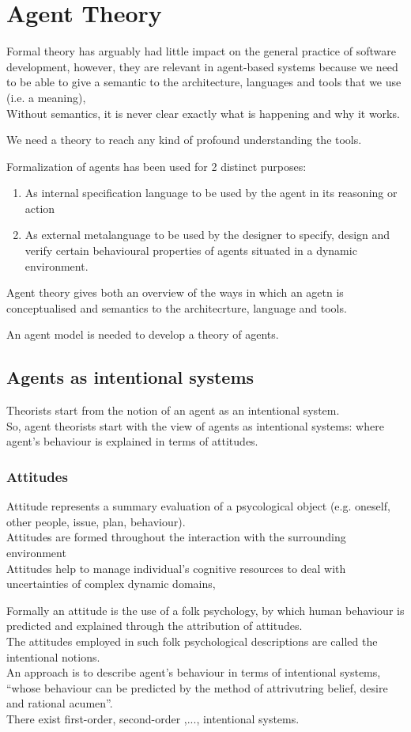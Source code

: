 \chapter{Agent Theory}
\minitoc

Formal theory has arguably had little impact on the general practice of software development, however, they are relevant in agent-based systems because we need to be able to give a semantic to the architecture, languages and tools that we use (i.e. a meaning),\\
Without semantics, it is never clear exactly what is happening and why it works.

We need a theory to reach any kind of profound understanding the tools.

Formalization of agents has been used for 2 distinct purposes:
\begin{enumerate}
\item As internal specification language to be used by the agent in its reasoning or action
\item As external metalanguage to be used by the designer to specify, design and verify certain behavioural properties of agents situated in a dynamic environment.
\end{enumerate}
Agent theory gives both an overview of the ways in which an agetn is conceptualised and semantics to the architecrture, language and tools.

An agent model is needed to develop a theory of agents.
\section{Agents as intentional systems}
Theorists start from the notion of an agent as an intentional system.\\
So, agent theorists start with the view of agents as intentional systems: where agent's behaviour is explained in terms of attitudes.
\subsection{Attitudes}
Attitude represents a summary evaluation of a psycological object (e.g. oneself, other people, issue, plan, behaviour).\\
Attitudes are formed throughout the interaction with the surrounding environment\\
Attitudes help to manage individual's cognitive resources to deal with uncertainties of complex dynamic domains,

Formally an attitude is the use of a folk psychology, by which human behaviour is predicted and explained through the attribution of attitudes.\\
The attitudes employed in such folk psychological descriptions are called the intentional notions.\\
An approach is to describe agent's behaviour in terms of intentional systems, ``whose behaviour can be predicted by the method of attrivutring belief, desire and rational acumen''.\\
There exist first-order, second-order ,..., intentional systems.

